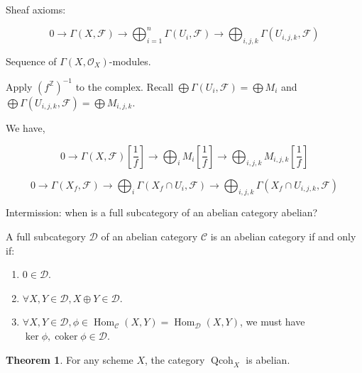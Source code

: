 \documentclass{article}
\theoremstyle{definition}
\newtheorem{theorem}{Theorem}
\begin{document}
    Sheaf axioms:

    \[
        0 \to \Gamma(X,\mathcal{F}) \to \bigoplus_{i=1}^n \Gamma(U_{i}, \mathcal{F}) \to \bigoplus_{i,j,k} \Gamma (U_{i,j,k}, \mathcal{F})
    \]

    Sequence of \(\Gamma (X , \mathcal{O}_X)\)-modules.

    Apply \((f^{\mathbb{Z}}) ^{-1}\) to the complex. Recall \(\bigoplus \Gamma (U_i , \mathcal{F}) = \bigoplus M_i\) and \(\bigoplus \Gamma (U_{i,j,k} ,\mathcal{F}) = \bigoplus M_{i,j,k}\).
        
    We have,
        
    \[
       0 \to \Gamma(X, \mathcal{F})\left[ \frac{1}{f} \right] \to \bigoplus_{i} M_i \left[ \frac{1}{f} \right] \to \bigoplus_{i,j,k} M_{i,j,k} \left[ \frac{1}{f} \right] 
    \]

    \[
        0 \to \Gamma(X_f , \mathcal{F}) \to \bigoplus_{i} \Gamma (X_f \cap U_i , \mathcal{F}) \to \bigoplus_{i,j,k} \Gamma (X_f \cap U_{i,j,k} , \mathcal{F})
    \]

    Intermission: when is a full subcategory of an abelian category abelian?

    A full subcategory \(\mathcal{D}\) of an abelian category \(\mathcal{C}\) is an abelian category if and only if:

    \begin{enumerate}[label=\arabic*)]
        \item \(0\in \mathcal{D}\).
        \item \(\forall X , Y \in \mathcal{D}, X \oplus Y \in \mathcal{D}\).
        \item \(\forall X,Y \in \mathcal{D}, \phi \in \operatorname{Hom}_{\mathcal{C}}(X,Y) = \operatorname{Hom}_{\mathcal{D}}(X,Y)\), we must have \(\ker \phi, \operatorname{coker} \phi \in \mathcal{D}\).  
    \end{enumerate} 

    \begin{theorem}
        For any scheme \(X\), the category \(\operatorname{Qcoh}_X\) is abelian.
    \end{theorem}
\end{document}
